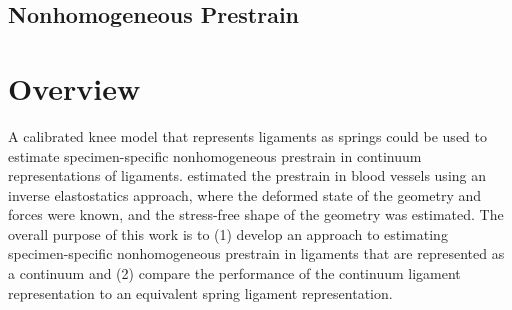 
\subsection*{Nonhomogeneous Prestrain}

\section{Overview}
A calibrated knee model that represents ligaments as springs could be used to estimate specimen-specific nonhomogeneous prestrain in continuum representations of ligaments. \cite{lu_computational_2007} estimated the prestrain in blood vessels using an inverse elastostatics approach, where the deformed state of the geometry and forces were known, and the stress-free shape of the geometry was estimated. The overall purpose of this work is to (1) develop an approach to estimating specimen-specific nonhomogeneous prestrain in ligaments that are represented as a continuum and (2) compare the performance of the continuum ligament representation to an equivalent spring ligament representation. 

